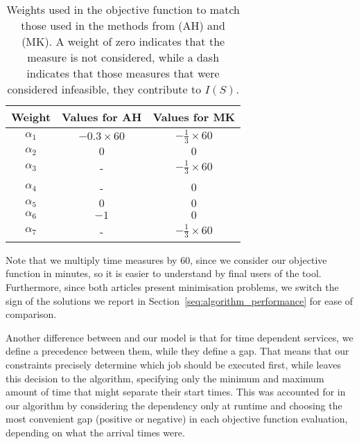 \documentclass[a4paper,11pt]{elsarticle}
\begin{document}
\begin{table}[htbp!]
    \centering
    \caption{Weights used in the objective function to match those used in the methods from  \cite{AitHaddadene2016} (AH) and \cite{Mankowska2014} (MK). A weight of zero indicates that the measure is not considered, while a dash indicates that those measures that were considered infeasible, \ie they contribute to $I(S)$.}
    \begin{tabular}{ccc}
    \hline
    \textbf{Weight}  & \textbf{Values for AH} & \textbf{Values for MK} \\
    \hline
    $\alpha_1$      &   $-0.3\times60$          &  $-\frac{1}{3}\times60$   \\
    $\alpha_2$      &   $0$                     &  $0$                      \\
    $\alpha_3$      &   -                       &  $-\frac{1}{3}\times60$   \\
    $\alpha_4$      &   -                       &  $0$   \\   
    $\alpha_5$      &   $0$                     &  $0$                      \\       
    $\alpha_6$      &   $-1$                    &  $0$                      \\    
    $\alpha_7$      &   -                       &  $-\frac{1}{3}\times60$             \\    
    \hline
    \end{tabular}
    \label{tab:adapted_obj_values}
\end{table}

Note that we multiply time measures by $60$, since we consider our objective function in minutes, so it is easier to understand by final users of the tool. Furthermore, since both articles present minimisation problems, we switch the sign of the solutions we report in Section~\ref{seq:algorithm_performance} for ease of comparison.

Another difference between \cite{AitHaddadene2016} and our model is that for time dependent services, we define a precedence between them, while they define a gap. That means that our constraints precisely determine which job should be executed first, while \cite{AitHaddadene2016} leaves this decision to the algorithm, specifying only the minimum and maximum amount of time that might separate their start times. This was accounted for in our algorithm by considering the dependency only at runtime and choosing the most convenient gap (positive or negative) in each objective function evaluation, depending on what the arrival times were.
\end{document}
